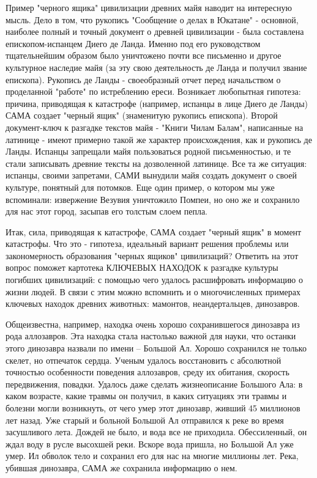 \documentclass[11pt,a4paper]{article}
\begin{document}
Пример "черного ящика" цивилизации древних майя наводит на интересную
мысль. Дело в том, что рукопись "Сообщение о делах в Юкатане" - основной,
наиболее полный и точный документ о древней цивилизации - была составлена
епископом-испанцем Диего де Ланда. Именно под его руководством тщательнейшим
образом было уничтожено почти все письменно и другое культурное наследие майя
(за эту свою деятельность де Ланда и получил звание епископа). Рукопись де
Ланды - своеобразный отчет перед начальством о проделанной "работе" по
истреблению ереси. Возникает любопытная гипотеза: причина, приводящая к
катастрофе (например, испанцы в лице Диего де Ланды) САМА создает "черный
ящик" (знаменитую рукопись епископа). Второй документ-ключ к разгадке текстов
майя - "Книги Чилам Балам", написанные на латинице - имеют примерно такой же
характер происхождения, как и рукопись де Ланды. Испанцы запрещали майя
пользоваться родной письменностью, и те стали записывать древние тексты на
дозволенной латинице. Все та же ситуация: испанцы, своими запретами, САМИ
вынудили майя создать документ о своей культуре, понятный для потомков. Еще
один пример, о котором мы уже вспоминали: извержение Везувия уничтожило
Помпеи, но оно же и сохранило для нас этот город, засыпав его толстым слоем
пепла.
\medskip

Итак, сила, приводящая к катастрофе, САМА создает "черный ящик" в момент
катастрофы. Что это - гипотеза, идеальный вариант решения проблемы или
закономерность образования "черных ящиков" цивилизаций? Ответить на этот
вопрос поможет картотека КЛЮЧЕВЫХ НАХОДОК к разгадке культуры погибших
цивилизаций: с помощью чего удалось расшифровать информацию о жизни людей. В
связи с этим можно вспомнить и о многочисленных примерах ключевых находок
древних животных: мамонтов, неандертальцев, динозавров.

Общеизвестна, например, находка очень хорошо сохранившегося динозавра из рода
аллозавров. Эта находка стала настолько важной для науки, что останки этого
динозавра назвали по имени – Большой Ал. Хорошо сохранился не только скелет,
но отпечаток сердца. Ученым удалось восстановить с абсолютной точностью
особенности поведения аллозавров, среду их обитания, скорость передвижения,
повадки. Удалось даже сделать жизнеописание Большого Ала: в каком возрасте,
какие травмы он получил, в каких ситуациях эти травмы и болезни могли
возникнуть, от чего умер этот динозавр, живший 45 миллионов лет назад. Уже
старый и больной Большой Ал отправился к реке во время засушливого
лета. Дождей не было, и вода все не приходила. Обессиленный, он ждал воду в
русле высохшей реки. Вскоре вода пришла, но Большой Ал уже умер. Ил обволок
тело и сохранил его для нас на многие миллионы лет. Река, убившая динозавра,
САМА же сохранила информацию о нем.
\medskip
\end{document}
